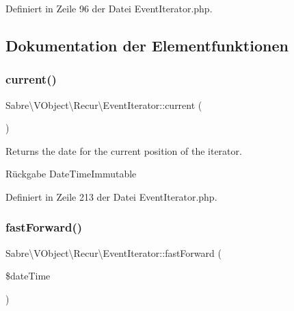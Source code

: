 Definiert in Zeile 96 der Datei Event\+Iterator.\+php.



\subsection{Dokumentation der Elementfunktionen}
\mbox{\label{class_sabre_1_1_v_object_1_1_recur_1_1_event_iterator_a72e09d20d602ed05da2a4728770bdff6}} 
\subsubsection{\texorpdfstring{current()}{current()}}
{\footnotesize\ttfamily Sabre\textbackslash{}\+V\+Object\textbackslash{}\+Recur\textbackslash{}\+Event\+Iterator\+::current (\begin{DoxyParamCaption}{ }\end{DoxyParamCaption})}

Returns the date for the current position of the iterator.

\begin{DoxyReturn}{Rückgabe}
Date\+Time\+Immutable 
\end{DoxyReturn}


Definiert in Zeile 213 der Datei Event\+Iterator.\+php.

\mbox{\label{class_sabre_1_1_v_object_1_1_recur_1_1_event_iterator_aedf9da3d9ea6e81bd5d6805c3b9750d3}} 
\subsubsection{\texorpdfstring{fast\+Forward()}{fastForward()}}
{\footnotesize\ttfamily Sabre\textbackslash{}\+V\+Object\textbackslash{}\+Recur\textbackslash{}\+Event\+Iterator\+::fast\+Forward (\begin{DoxyParamCaption}\item[{Date\+Time\+Interface}]{\$date\+Time }\end{DoxyParamCaption})}

